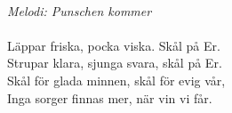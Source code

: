 \\
{\footnotesize\textit{Melodi: Punschen kommer}}\\
\\
Läppar friska, pocka viska. Skål på Er.\\
Strupar klara, sjunga svara, skål på Er.\\
Skål för glada minnen, skål för evig vår,\\
Inga sorger finnas mer, när vin vi får.
